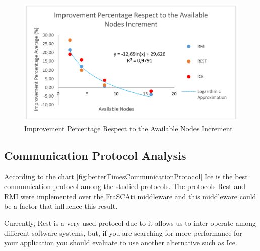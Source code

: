	\begin{figure}
		\centering
		\includegraphics[trim=0.5cm 19cm 1cm 1cm]{fig/availableNodes.eps}
		\caption{Improvement Percentage Respect to the Available Nodes Increment}
		\label{fig:availableNodes}
	\end{figure}

\subsection{Communication Protocol Analysis}
According to the chart \ref{fig:betterTimesCommunicationProtocol} Ice is the best communication protocol among the studied protocols. The protocols Rest and RMI were implemented over the FraSCAti middleware and this middleware could be a factor that influence this result. 

Currently, Rest is a very used protocol due to it allows us to inter-operate among different software systems, but, if you are searching for more performance for your application you should evaluate to use another alternative such as Ice. \\

